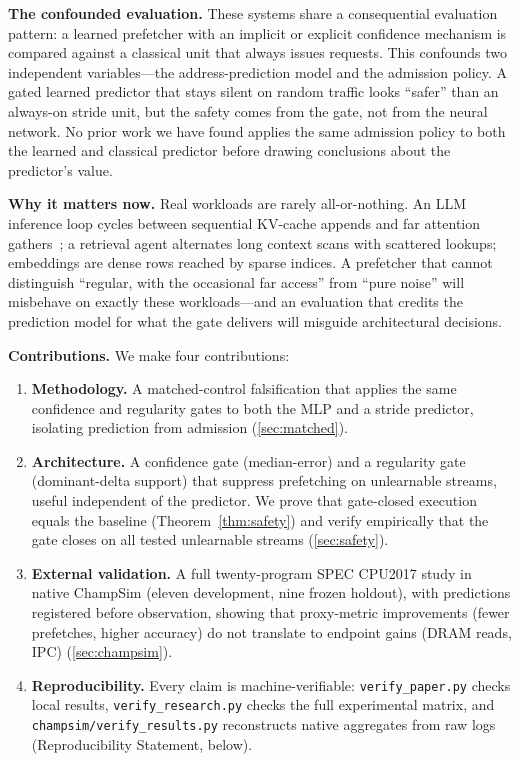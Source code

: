 \documentclass[sigplan,anonymous,review,nonacm]{acmart}
\begin{document}
\textbf{The confounded evaluation.}
These systems share a consequential evaluation pattern: a learned prefetcher
with an implicit or explicit confidence mechanism is compared against a
classical unit that always issues requests. This confounds two independent
variables---the address-prediction model and the admission policy. A gated
learned predictor that stays silent on random traffic looks ``safer'' than an
always-on stride unit, but the safety comes from the gate, not from the
neural network. No prior work we have found applies the same admission
policy to both the learned and classical predictor before drawing
conclusions about the predictor's value.

\textbf{Why it matters now.}
Real workloads are rarely all-or-nothing. An LLM inference loop cycles
between sequential KV-cache appends and far attention
gathers~\cite{kwon2023vllm,pope2023}; a retrieval agent alternates long
context scans with scattered lookups; embeddings are dense rows reached by
sparse indices. A prefetcher that cannot distinguish ``regular, with the
occasional far access'' from ``pure noise'' will misbehave on exactly these
workloads---and an evaluation that credits the prediction model for what the
gate delivers will misguide architectural decisions.

\textbf{Contributions.} We make four contributions:
\begin{enumerate}
\item \textbf{Methodology.} A matched-control falsification that applies the
same confidence and regularity gates to both the MLP and a stride predictor,
isolating prediction from admission (\cref{sec:matched}).
\item \textbf{Architecture.} A confidence gate (median-error) and a
regularity gate (dominant-delta support) that suppress prefetching on
unlearnable streams, useful independent of the predictor. We prove that
gate-closed execution equals the baseline (Theorem~\ref{thm:safety}) and
verify empirically that the gate closes on all tested unlearnable
streams (\cref{sec:safety}).
\item \textbf{External validation.} A full twenty-program SPEC CPU2017 study
in native ChampSim (eleven development, nine frozen holdout), with
predictions registered before observation, showing that proxy-metric
improvements (fewer prefetches, higher accuracy) do not translate to
endpoint gains (DRAM reads, IPC) (\cref{sec:champsim}).
\item \textbf{Reproducibility.} Every claim is machine-verifiable:
\texttt{verify\_paper.py} checks local results,
\texttt{verify\_research.py} checks the full experimental matrix, and
\texttt{champsim/verify\_results.py} reconstructs native aggregates from
raw logs (Reproducibility Statement, below).
\end{enumerate}
\end{document}
